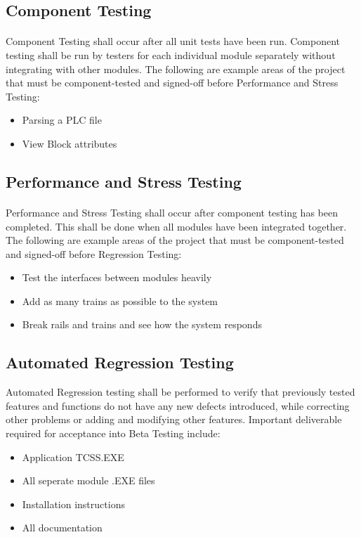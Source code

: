 \documentclass{article}
\begin{document}
        
        
    \subsection{Component Testing}
    \paragraph{}
    Component Testing shall occur after all unit tests have been run. Component testing shall be run by testers for each individual module separately without integrating with other modules. The following are example areas of the project that must be component-tested and signed-off before Performance and Stress Testing:
    \begin{itemize}
        \item Parsing a PLC file
        \item View Block attributes
        \end{itemize}
            

    \subsection{Performance and Stress Testing}
    \paragraph{}
    Performance and Stress Testing shall occur after component testing has been completed. This shall be done when all modules have been integrated together. The following are example areas of the project that must be component-tested and signed-off before Regression Testing:
    \begin{itemize}
        \item Test the interfaces between modules heavily
        \item Add as many trains as possible to the system
        \item Break rails and trains and see how the system responds
    \end{itemize}
    \subsection{Automated Regression Testing}
    \parargraph{}
    Automated Regression testing shall be performed to verify that previously tested features and functions do not have any new defects introduced, while correcting other problems or adding and modifying other features. Important deliverable required for acceptance into Beta Testing include:
    \begin{itemize}
        \item Application TCSS.EXE
        \item All seperate module .EXE files
        \item Installation instructions
        \item All documentation
    \end{itemize}
\end{document}
